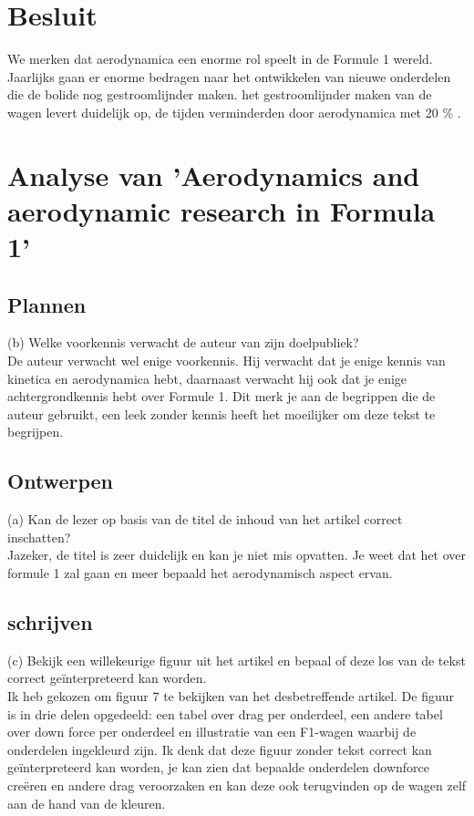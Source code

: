 \documentclass[a4paper,kulak]{kulakarticle} %
\begin{document}
\section*{Besluit}

We merken dat aerodynamica een enorme rol speelt in de Formule 1 wereld. Jaarlijks gaan er enorme bedragen naar het ontwikkelen van nieuwe onderdelen die de bolide nog gestroomlijnder maken. het gestroomlijnder maken van de wagen levert duidelijk op, de tijden verminderden door aerodynamica met 20 \% .









\clearpage
\section*{Analyse van 'Aerodynamics and aerodynamic research in Formula 1'}

\subsection{Plannen}
(b) Welke voorkennis verwacht de auteur van zijn doelpubliek?
\\

De auteur verwacht wel enige voorkennis. Hij verwacht dat je enige kennis van kinetica en aerodynamica hebt, daarnaast verwacht hij ook dat je enige achtergrondkennis hebt over Formule 1.
Dit merk je aan de begrippen die de auteur gebruikt, een leek zonder kennis heeft het moeilijker om deze tekst te begrijpen. 
\subsection{Ontwerpen}
(a) Kan de lezer op basis van de titel de inhoud van het artikel correct inschatten?
\\

Jazeker, de titel is zeer duidelijk en kan je niet mis opvatten. Je weet dat het over formule 1 zal gaan en meer bepaald het aerodynamisch aspect ervan.
\subsection{schrijven}
(c) Bekijk een willekeurige figuur uit het artikel en bepaal of deze los van de tekst correct geïnterpreteerd kan worden.
\\

Ik heb gekozen om figuur 7 te bekijken van het desbetreffende artikel. De figuur is in drie delen opgedeeld: een tabel over drag per onderdeel, een andere tabel over down force per onderdeel en illustratie van een F1-wagen waarbij de onderdelen ingekleurd zijn. Ik denk dat deze figuur zonder tekst correct kan geïnterpreteerd kan worden, je kan zien dat bepaalde onderdelen downforce creëren en andere drag veroorzaken en kan deze ook terugvinden op de wagen zelf aan de hand van de kleuren.
\end{document}
